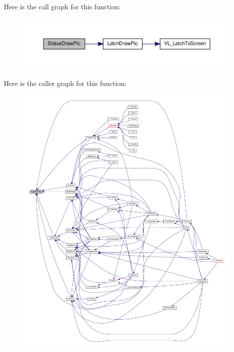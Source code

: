 Here is the call graph for this function:
\nopagebreak
\begin{figure}[H]
\begin{center}
\leavevmode
\includegraphics[width=400pt]{WL__AGENT_8C_adc83960f6d18ebc42df7465f6bbc0e75_cgraph}
\end{center}
\end{figure}




Here is the caller graph for this function:
\nopagebreak
\begin{figure}[H]
\begin{center}
\leavevmode
\includegraphics[width=400pt]{WL__AGENT_8C_adc83960f6d18ebc42df7465f6bbc0e75_icgraph}
\end{center}
\end{figure}


